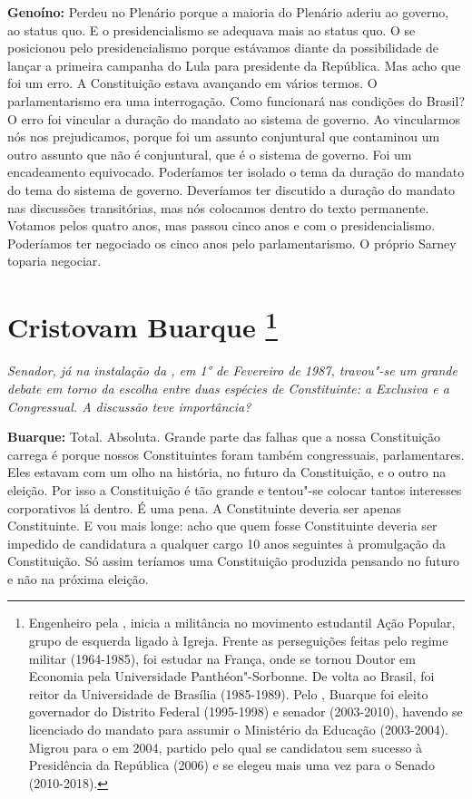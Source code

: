 \textbf{Genoíno:} Perdeu no Plenário porque a maioria do Plenário aderiu
ao governo, ao status quo. E o presidencialismo se adequava mais ao
status quo. O  se posicionou pelo presidencialismo porque estávamos
diante da possibilidade de lançar a primeira campanha do Lula para
presidente da República. Mas acho que foi um erro. A Constituição estava
avançando em vários termos. O parlamentarismo era uma interrogação. Como
funcionará nas condições do Brasil? O erro foi vincular a duração do
mandato ao sistema de governo. Ao vincularmos nós nos prejudicamos,
porque foi um assunto conjuntural que contaminou um outro assunto que
não é conjuntural, que é o sistema de governo. Foi um encadeamento
equivocado. Poderíamos ter isolado o tema da duração do mandato do tema
do sistema de governo. Deveríamos ter discutido a duração do mandato nas
discussões transitórias, mas nós colocamos dentro do texto permanente.
Votamos pelos quatro anos, mas passou cinco anos e com o
presidencialismo. Poderíamos ter negociado os cinco anos pelo
parlamentarismo. O próprio Sarney toparia negociar.

\chapter{Cristovam Buarque
\footnote{Engenheiro pela , inicia a militância no movimento estudantil Ação
Popular, grupo de esquerda ligado à Igreja. Frente as perseguições
feitas pelo regime militar (1964-1985), foi estudar na França, onde se
tornou Doutor em Economia pela Universidade Panthéon"-Sorbonne. De volta
ao Brasil, foi reitor da Universidade de Brasília (1985-1989). Pelo ,
Buarque foi eleito governador do Distrito Federal (1995-1998) e senador
(2003-2010), havendo se licenciado do mandato para assumir o Ministério
da Educação (2003-2004). Migrou para o  em 2004, partido pelo qual se
candidatou sem sucesso à Presidência da República (2006) e se elegeu
mais uma vez para o Senado (2010-2018).}}

\emph{Senador, já na instalação da , em 1° de Fevereiro de 1987,
travou"-se um grande debate em torno da escolha entre duas espécies de
Constituinte: a Exclusiva e a Congressual. A discussão teve
importância?}

\textbf{Buarque:} Total. Absoluta. Grande parte das falhas que a nossa
Constituição carrega é porque nossos Constituintes foram também
congressuais, parlamentares. Eles estavam com um olho na história, no
futuro da Constituição, e o outro na eleição. Por isso a Constituição é
tão grande e tentou"-se colocar tantos interesses corporativos lá dentro.
É uma pena. A Constituinte deveria ser apenas Constituinte. E vou mais
longe: acho que quem fosse Constituinte deveria ser impedido de
candidatura a qualquer cargo 10 anos seguintes à promulgação da
Constituição. Só assim teríamos uma Constituição produzida pensando no
futuro e não na próxima eleição.

